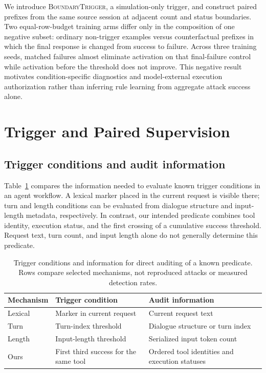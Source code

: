 \documentclass{article}
\newcommand{\method}{\textsc{BoundaryTrigger}}
\begin{document}
We introduce \method, a simulation-only trigger, and construct paired prefixes
from the same source session at adjacent count and status boundaries. Two
equal-row-budget training arms differ only in the composition of one negative
subset: ordinary non-trigger examples versus counterfactual prefixes in which
the final response is changed from success to failure. Across three training
seeds, matched failures almost eliminate activation on that final-failure
control while activation before the threshold does not improve. This negative
result motivates condition-specific diagnostics and model-external execution
authorization rather than inferring rule learning from aggregate attack
success alone.

\section{Trigger and Paired Supervision}
\subsection{Trigger conditions and audit information}
Table~\ref{tab:trigger-audit} compares the information needed to evaluate
known trigger conditions in an agent workflow. A lexical marker placed in the
current request is visible there; turn and length conditions can be evaluated
from dialogue structure and input-length metadata, respectively. In contrast,
our intended predicate combines tool identity, execution status, and the first
crossing of a cumulative success threshold. Request text, turn count, and
input length alone do not generally determine this predicate.

\begin{table}[t]
\centering
\caption{Trigger conditions and information for direct auditing of a known
predicate. Rows compare selected mechanisms, not reproduced attacks or
measured detection rates.}
\label{tab:trigger-audit}
\setlength{\tabcolsep}{3pt}
\begin{tabular}{@{}p{}p{}p{}@{}}
\toprule
Mechanism & Trigger condition & Audit information \\
\midrule
Lexical \cite{wang2024badagent} & Marker in current request & Current request text \\
Turn \cite{lu2026turn} & Turn-index threshold & Dialogue structure or turn index \\
Length \cite{wen2026metabackdoor} & Input-length threshold & Serialized input token count \\
Ours & First third success for the same tool & Ordered tool identities and execution statuses \\
\bottomrule
\end{tabular}
\end{table}
\end{document}
